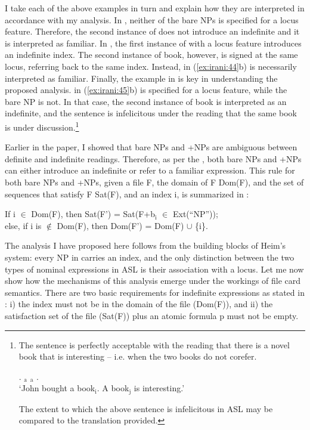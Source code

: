 \documentclass[output=paper,
modfonts
]{langscibook}
\begin{document}
I take each of the above examples in turn and explain how they are interpreted in accordance with my analysis. In , neither of the bare NPs  is specified for a locus feature. Therefore, the second instance of  does not introduce an indefinite and it is interpreted as familiar. In , the first instance of  with a locus feature introduces an indefinite index. The second instance of book, however, is signed at the same locus, referring back to the same index. Instead,  in (\ref{ex:irani:44}b) is necessarily interpreted as familiar. Finally, the example in  is key in understanding the proposed analysis.  in (\ref{ex:irani:45}b) is specified for a locus feature, while the bare NP  is not. In that case, the second instance of book is interpreted as an indefinite, and the sentence is infelicitous under the reading that the same book is under discussion.\footnote{The sentence is perfectly acceptable with the reading that there is a novel book that is interesting -- i.e. when the two books do not corefer.  
	
	\ea {}
	\normalfont {}. $_\text{a}$ $_\text{a}$ .\\
		`John bought a book$_\text{i}$. A book$_\text{j}$ is interesting.'
	\z

The extent to which the above sentence is infelicitous in ASL may be compared to the  translation provided.} 

Earlier in the paper, I showed that bare NPs and +NPs are ambiguous between definite and indefinite readings. Therefore, as per the , both bare NPs and +NPs can either introduce an indefinite or refer to a familiar expression. This rule for both bare NPs and +NPs, given a file F, the domain of F Dom(F), and the set of sequences that satisfy F Sat(F), and an index i, is summarized in : 

\begin{exe}
\ex \label{ex:irani:46} If i \(\in\) Dom(F), then Sat(F') = Sat(F+b$_\text{i}$ \(\in\) Ext(``NP''));\\ else, if i is \(\notin\) Dom(F), then Dom(F') = Dom(F) \(\cup\) \{i\}. \par  
\end{exe}

The analysis I have proposed here follows from the building blocks of Heim's system: every NP in  carries an index, and the only distinction between the two types of nominal expressions in ASL is their association with a locus. Let me now show how the mechanisms of this analysis emerge under the workings of file card semantics. There are two basic requirements for indefinite expressions as stated in : i) the index must not be in the domain of the file (Dom(F)), and ii) the satisfaction set of the file (Sat(F)) plus an atomic formula p must not be empty. 
\end{document}
